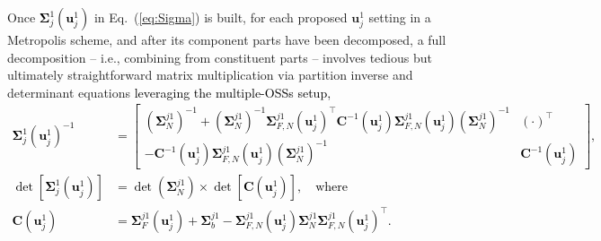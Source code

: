 \documentclass[12pt]{article}
\newcommand{\blu}[1]{\textcolor{black}{#1}} %
\newcommand{\blunew}[1]{\textcolor{black}{#1}} %
\begin{document}
Once \blunew{$\mathbf{\Sigma}_j^1(\mathbf{u}^1_j)$} in Eq.~(\ref{eq:Sigma}) is built, for each
proposed $\mathbf{u}^1_j$ setting in a Metropolis scheme, and after its
component parts have been decomposed, a full decomposition -- i.e., combining
from constituent parts -- involves tedious but ultimately straightforward
matrix multiplication  via partition inverse and determinant equations
\citep[e.g.,][]{Petersen:2008}
\blu{ leveraging the multiple-OSSs setup, 
\blunew{\begin{align}
\mathbf{\Sigma}^1_j(\mathbf{u}^1_j)^{-1}  
& = \begin{bmatrix}(\mathbf{\Sigma}^{j1}_{N} )^{-1} +(\mathbf{\Sigma}^{j1}_{N} )^{-1} \mathbf{\Sigma}^{j1}_{F, N}(\mathbf{u}^1_j) ^\top
\mathbf{C}^{-1} (\mathbf{u}^1_j ) \mathbf{\Sigma}^{j1}_{F, N}(\mathbf{u}^1_j)(\mathbf{\Sigma}^{j1}_{N} )^{-1} 
 & (\cdot)^\top \\ 
-\mathbf{C}^{-1} (\mathbf{u}^1_j ) \mathbf{\Sigma}^{j1}_{F, N}(\mathbf{u}^1_j)(\mathbf{\Sigma}^{j1}_{N} )^{-1} 
& \mathbf{C}^{-1} (\mathbf{u}^1_j ) \end{bmatrix}, \nonumber \\
\det[ \mathbf{\Sigma}^1_j(\mathbf{u}^1_j)] 
&= \det(\mathbf{\Sigma}^{j1}_{N} ) \times \det[\mathbf{C} (\mathbf{u}^1_j )], \quad \text{where} \nonumber \\
\mathbf{C} (\mathbf{u}^1_j  ) 
& = \mathbf{\Sigma}^{j1}_{F}(\mathbf{u}^1_j)  + \mathbf{\Sigma}^{j1}_{b}
 - \mathbf{\Sigma}^{j1}_{F, N}(\mathbf{u}^1_j) 
\mathbf{\Sigma}^{j1}_{N} \mathbf{\Sigma}^{j1}_{F, N}(\mathbf{u}^1_j) ^\top.
\end{align}
}}
\end{document}
